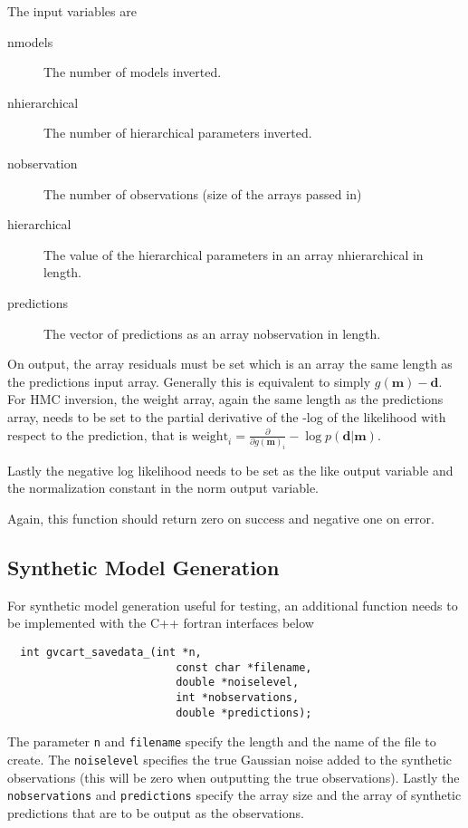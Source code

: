 \documentclass[a4paper,12pt]{article}
\begin{document}
The input variables are

\begin{description}
\item[nmodels] The number of models inverted.
\item[nhierarchical] The number of hierarchical parameters inverted.
\item[nobservation] The number of observations (size of the arrays passed in)
\item[hierarchical] The value of the hierarchical parameters in an array nhierarchical in length.
\item[predictions] The vector of predictions as an array nobservation in length.
\end{description}

On output, the array residuals must be set which is an array the same length as the
predictions input array. Generally this is equivalent to simply $g(\mathbf{m}) - \mathbf{d}$.
For HMC inversion, the weight array, again the same length as the predictions array, needs
to be set to the partial derivative of the -log of the likelihood with respect to the
prediction, that is $\mathrm{weight}_i = \frac{\partial}{\partial g(\mathbf{m})_i} -\log p(\mathbf{d}|\mathbf{m})$.

Lastly the negative log likelihood needs to be set as the like output variable and the normalization
constant in the norm output variable.

Again, this function should return zero on success and negative one on error.

\subsection{Synthetic Model Generation}

For synthetic model generation useful for testing, an additional function needs to be
implemented with the C++ fortran interfaces below

\begin{verbatim}
  int gvcart_savedata_(int *n,
                          const char *filename,
                          double *noiselevel,
                          int *nobservations,
                          double *predictions);
\end{verbatim}

The parameter {\tt n} and {\tt filename} specify the length and the name
of the file to create. The {\tt noiselevel} specifies the true Gaussian
noise added to the synthetic observations (this will be zero when
outputting the true observations). Lastly the {\tt nobservations} and
{\tt predictions} specify the array size and the array of synthetic
predictions that are to be output as the observations.
\end{document}
